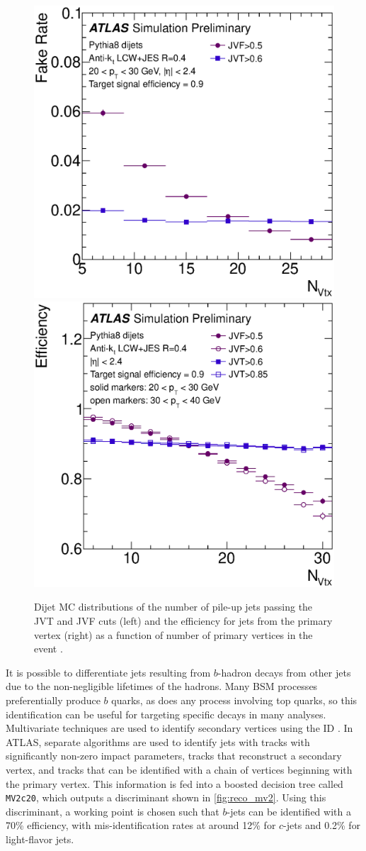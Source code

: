 \begin{centering}
\begin{figure}[!hbt]
\myfloatalign
\includegraphics[width=.48\linewidth]{figures/reco/jvt_fig_06b.eps}
\includegraphics[width=.48\linewidth]{figures/reco/jvt_fig_07a.eps}
\caption{ Dijet \ac{MC} distributions of the number of pile-up jets passing the \ac{JVT} and \ac{JVF} cuts (left) and the efficiency for jets from the primary vertex (right) as a function of number of primary vertices in the event \cite{ATLAS-CONF-2014-018}. }
\label{fig:reco_jvt}
\end{figure}
\end{centering}

It is possible to differentiate jets resulting from $b$-hadron decays from other jets due to the non-negligible lifetimes of the hadrons. Many \ac{BSM} processes preferentially produce $b$ quarks, as does any process involving top quarks, so this identification can be useful for targeting specific decays in many analyses. Multivariate techniques are used to identify secondary vertices using the \ac{ID} \cite{ATL-PHYS-PUB-2015-022}. In \ac{ATLAS}, separate algorithms are used to identify jets with tracks with significantly non-zero impact parameters, tracks that reconstruct a secondary vertex, and tracks that can be identified with a chain of vertices beginning with the primary vertex. This information is fed into a boosted decision tree called \texttt{MV2c20}, which outputs a discriminant shown in \autoref{fig:reco_mv2}. Using this discriminant, a working point is chosen such that $b$-jets can be identified with a 70\% efficiency, with mis-identification rates at around 12\% for $c$-jets and 0.2\% for light-flavor jets.

